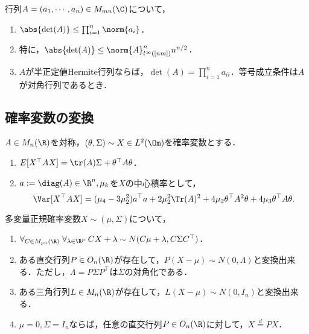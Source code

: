 \documentclass[uplatex, dvipdfmx]{jsreport}
\begin{document}
\begin{proposition}[Hadamard]
    行列$A=(a_1,\cdots,a_n)\in M_{mn}(\C)$について，
    \begin{enumerate}
        \item $\abs{\det(A)}\le\prod_{i=1}^n\norm{a_i}$．
        \item 特に，$\abs{\det(A)}\le\norm{A}_{l^\infty([nm])}^nn^{n/2}$．
        \item $A$が半正定値Hermite行列ならば，$\det(A)=\prod_{i=1}^na_{ii}$．等号成立条件は$A$が対角行列であるとき．
    \end{enumerate}
\end{proposition}

\subsection{確率変数の変換}

\begin{proposition}[平均と分散]
    $A\in M_n(\R)$を対称，$(\theta,\Sigma)\sim X\in L^2(\Om)$を確率変数とする．
    \begin{enumerate}
        \item $E[X^\top AX]=\tr(A)\Sigma+\theta^\top A\theta$．
        \item $a:=\diag(A)\in\R^n,\mu_k$を$X$の中心積率として，
        \[\Var[X^\top AX]=(\mu_4-3\mu_2^2)a^\top a+2\mu_2^2\Tr(A)^2+4\mu_2\theta^\top A^2\theta+4\mu_3\theta^\top A\theta.\]
    \end{enumerate}
\end{proposition}

\begin{proposition}[多変量正規分布の変換]
    多変量正規確率変数$X\sim (\mu,\Sigma)$について，
    \begin{enumerate}
        \item $\forall_{C\in M_{pn}(\R)}\;\forall_{\lambda\in\R^p}\;CX+\lambda\sim N(C\mu+\lambda,C\Sigma C^\top)$．
        \item ある直交行列$P\in O_n(\R)$が存在して，$P(X-\mu)\sim N(0,\Lambda)$と変換出来る．ただし，$\Lambda=P\Sigma P^\top$は$\Sigma$の対角化である．
        \item ある三角行列$L\in M_n(\R)$が存在して，$L(X-\mu)\sim N(0,I_n)$と変換出来る．
        \item $\mu=0,\Sigma=I_n$ならば，任意の直交行列$P\in O_n(\R)$に対して，$X\overset{d}{=}PX$．
    \end{enumerate}
\end{proposition}
\end{document}

